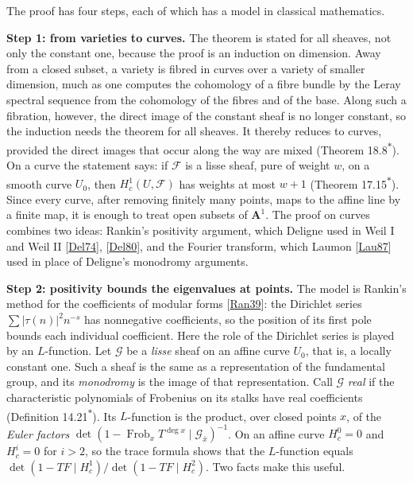 \documentclass[11pt]{article}
\newcommand{\bpout}[1]{#1\textsuperscript{\hyperlink{bp-outside}{\ensuremath{\ast}}}}
\begin{document}
The proof has four steps, each of which has a model in classical mathematics.

\textbf{Step 1: from varieties to curves.} The theorem is stated for all sheaves, not only the constant one, because the proof is an induction on dimension. Away from a closed subset, a variety is fibred in curves over a variety of smaller dimension, much as one computes the cohomology of a fibre bundle by the Leray spectral sequence from the cohomology of the fibres and of the base. Along such a fibration, however, the direct image of the constant sheaf is no longer constant, so the induction needs the theorem for all sheaves. It thereby reduces to curves, provided the direct images that occur along the way are mixed (Theorem \bpout{18.8}). On a curve the statement says: if \(\mathcal F\) is a lisse sheaf, pure of weight \(w\), on a smooth curve \(U_0\), then \(H^1_c(U,\mathcal F)\) has weights at most \(w+1\) (Theorem \bpout{17.15}). Since every curve, after removing finitely many points, maps to the affine line by a finite map, it is enough to treat open subsets of \(\mathbf A^1\). The proof on curves combines two ideas: Rankin's positivity argument, which Deligne used in Weil I and Weil II [\hyperref[bp28]{Del74}], [\hyperref[bp29]{Del80}], and the Fourier transform, which Laumon [\hyperref[bp30]{Lau87}] used in place of Deligne's monodromy arguments.

\textbf{Step 2: positivity bounds the eigenvalues at points.} The model is Rankin's method for the coefficients of modular forms [\hyperref[bp36]{Ran39}]: the Dirichlet series \(\sum|\tau(n)|^2n^{-s}\) has nonnegative coefficients, so the position of its first pole bounds each individual coefficient. Here the role of the Dirichlet series is played by an \(L\)-function. Let \(\mathcal G\) be a \emph{lisse} sheaf on an affine curve \(U_0\), that is, a locally constant one. Such a sheaf is the same as a representation of the fundamental group, and its \emph{monodromy} is the image of that representation. Call \(\mathcal G\) \emph{real} if the characteristic polynomials of Frobenius on its stalks have real coefficients (Definition \bpout{14.21}). Its \(L\)-function is the product, over closed points \(x\), of the \emph{Euler factors} \(\det(1-\operatorname{Frob}_x T^{\deg x}\mid\mathcal G_{\bar x})^{-1}\). On an affine curve \(H^0_c=0\) and \(H^i_c=0\) for \(i>2\), so the trace formula shows that the \(L\)-function equals \(\det(1-TF\mid H^1_c)/\det(1-TF\mid H^2_c)\). Two facts make this useful.
\end{document}
